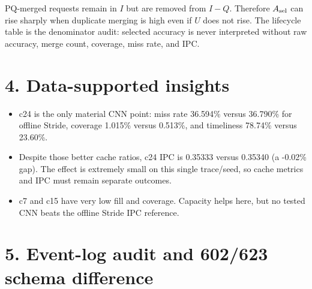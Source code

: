 \documentclass[10pt]{article}
\begin{document}
\begin{infobox}[title={\bfseries Why raw and selected accuracy can disagree}]
PQ-merged requests remain in $I$ but are removed from $I-Q$.  Therefore
$A_{\rm sel}$ can rise sharply when duplicate merging is high even if $U$ does
not rise.  The lifecycle table is the denominator audit: selected accuracy is
never interpreted without raw accuracy, merge count, coverage, miss rate, and
IPC.
\end{infobox}

\section*{4. Data-supported insights}
\begin{infobox}[fontupper=\small]
\begin{itemize}[itemsep=1pt,topsep=1pt]
\item c24 is the only material CNN point: miss rate 36.594\% versus 36.790\% for offline Stride, coverage 1.015\% versus 0.513\%, and timeliness 78.74\% versus 23.60\%.
\item Despite those better cache ratios, c24 IPC is 0.35333 versus 0.35340 (a -0.02\% gap).  The effect is extremely small on this single trace/seed, so cache metrics and IPC must remain separate outcomes.
\item c7 and c15 have very low fill and coverage.  Capacity helps here, but no tested CNN beats the offline Stride IPC reference.
\end{itemize}
\end{infobox}

\section*{5. Event-log audit and 602/623 schema difference}
\begin{center}\scriptsize
{}
\end{center}
\end{document}
